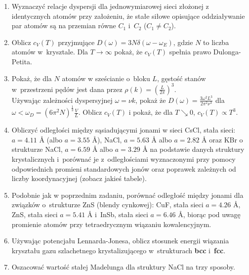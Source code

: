 \documentclass[a4paper,11pt]{article}
\begin{document}
\begin{enumerate}

\item Wyznaczyć relacje dyspersji dla jednowymiarowej sieci złożonej z
  identycznych atomów przy założeniu, że stałe siłowe opisujące
  oddziaływanie par atomów są na przemian równe $C_{ 1 }$ i~$C_{ 2 }$
  ($C_{ 1 } \neq C_{ 2 }$).

\item Oblicz $c_{ V }( T )$ przyjmujące
  $D( \omega ) = 3 N \delta( \omega - \omega_{ E } )$, gdzie $N$ to
  liczba atomów w~krysztale. Dla $T \to \infty$ pokaż, że
  $c_{ V }( T )$ spełnia prawo Dulonga-Petita.

\item Pokaż, że dla $N$ atomów w sześcianie o~bloku $L$, gęstość stanów w~przestrzeni pędów jest dana przez $\rho( k ) = \left( \frac{ L }{ 2\pi } \right)^{ 3 }$. \\
  Używając zależności dyspersyjnej $\omega = \nu k$, pokaż że
  $D( \omega ) = \frac{ 3 \omega^{ 2 } L^{ 3 } }{ 2\pi^{ 2 } \nu^{ 3 }
  }$ dla
  $\omega < \omega_{ D } = ( 6 \pi^{ 2 } N )^{ \frac{ 1 }{ 3 } }
  \frac{ V }{ L }$. Oblicz $c_{ V }( T )$ i pokaż, że dla
  $T \searrow 0$, $c_{ V }( T ) \propto T^{ 3 }$.
\item Obliczyć odległości między sąsiadującymi jonami w sieci CsCl,
  stała sieci: $a = 4.11$ \AA{} (albo $a = 3.55$ \AA), NaCl,
  $a = 5.63$ \AA{} albo $a = 2.82$ \AA{} oraz KBr o strukturze NaCl,
  $a = 6.59$ \AA{} albo $a = 3.29$ \AA{} na podstawie danych struktury
  krystalicznych i~porównać je z~odległościami wyznaczonymi przy
  pomocy odpowiednich promieni standardowych jonów oraz poprawek
  zależnych od liczby koordynacyjnej (zobacz jakieś tabele).

\item Podobnie jak w poprzednim zadaniu, porównać odległość między
  jonami dla związków o~strukturze ZnS (blendy cynkowej): CuF, stała
  sieci $a = 4.26$ \AA, ZnS, stała sieci $a = 5.41$ \AA{} i~InSb,
  stała sieci $a = 6.46$ \AA, biorąc pod uwagę promienie atomów przy
  tetraedrycznym wiązaniu kowalencyjnym.

\item Używając potencjału Lennarda-Jonesa, oblicz stosunek energii
  wiązania kryształu gazu szlachetnego krystalizującego w~strukturach
  \textbf{bcc} i~\textbf{fcc}.

\item Oszacować wartość stałej Madelunga dla struktury NaCl na trzy
  sposoby.


\end{enumerate}
\end{document}
